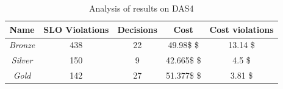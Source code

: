 \begin{table}
  {\scriptsize 
\begin{center}
    \begin{tabular}{  | c | c | c | c | c |}
    \hline
         \textbf{Name}  & \textbf{SLO Violations} & \textbf{Decisions}  & \textbf{Cost}  & \textbf{Cost violations} \\ \hline
   \textit{Bronze}   &  438 &  22 &  49.98\$ \$ & 13.14 \$ \\ \hline   
   \textit{Silver}  &  150 &  9 &  42.665\$ \$ &  4.5 \$ \\ \hline   
\textit{Gold} &  142 & 27 & 51.377\$ \$ & 3.81 \$ \\ \hline   

 \end{tabular}
\end{center}
\vspace{-5mm}
\caption{Analysis of results on DAS4}
\label{summaryDAS4}
}
\end{table}
